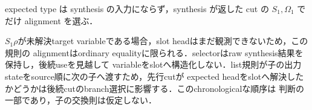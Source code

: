 expected type は synthesis の入力にならず，synthesis が返した cut の $S_1,\Omega_1$ でだけ
alignment を選ぶ．
\begin{mathpar}
\end{mathpar}

$S_1\rho$が未解決target variableである場合，slot headはまだ観測できないため，この規則の
alignmentはordinary equalityに限られる．selectorはraw synthesis結果を保持し，後続useを見越して
variableをslotへ構造化しない．list規則が子の出力stateをsource順に次の子へ渡すため，先行cutが
expected headをslotへ解決したかどうかは後続cutのbranch選択に影響する．このchronologicalな順序は
判断の一部であり，子の交換則は仮定しない．
